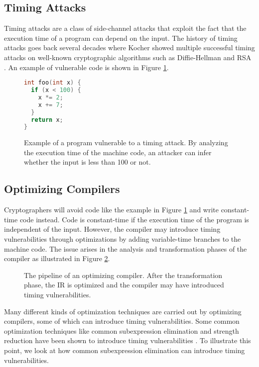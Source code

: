 \label{sec:preliminaries}
\subsection{Timing Attacks}
Timing attacks are a class of side-channel attacks that exploit the fact that the execution time of a program can depend on the input.
The history of timing attacks goes back several decades where Kocher showed multiple successful timing attacks on well-known cryptographic algorithms such as Diffie-Hellman and RSA \citep{1996-timing-attacks}.
An example of vulnerable code is shown in Figure \ref{fig:timing-attack-example}.
\begin{figure}[H]
  \begin{lstlisting}[style=defstyle,language=C, xleftmargin=6.8cm, xrightmargin=6.8cm, basicstyle=\footnotesize\ttfamily,breaklines=true]
int foo(int x) {
  if (x < 100) {
    x *= 2;
    x += 7;
  }
  return x;
} \end{lstlisting} 
  \caption{Example of a program vulnerable to a timing attack. 
  By analyzing the execution time of the machine code, an attacker can infer whether the input is less than 100 or not.}
  \label{fig:timing-attack-example}
\end{figure}

\subsection{Optimizing Compilers}
Cryptographers will avoid code like the example in Figure \ref{fig:timing-attack-example} and write constant-time code instead.
Code is constant-time if the execution time of the program is independent of the input.
However, the compiler may introduce timing vulnerabilities through optimizations by adding variable-time branches to the machine code.
The issue arises in the analysis and transformation phases of the compiler as illustrated in Figure \ref{fig:optimizing-compiler-pipeline}.

\begin{figure}[H]
  \centering
  
  \caption{The pipeline of an optimizing compiler. After the transformation phase, the IR is optimized and the compiler may have introduced timing vulnerabilities.}
  \label{fig:optimizing-compiler-pipeline}
\end{figure}

Many different kinds of optimization techniques are carried out by optimizing compilers, some of which can introduce timing vulnerabilities.
Some common optimization techniques like common subexpression elimination and strength reduction have been shown to introduce timing vulnerabilities \citep{optimizations-linked-to-timing-attacks}.
To illustrate this point, we look at how common subexpression elimination can introduce timing vulnerabilities.

